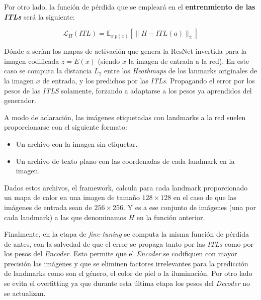             \medskip

            \noindent Por otro lado, la función de pérdida que se empleará en el \textbf{entrenmiento de las \textit{ITLs}} será la siguiente: 

            \begin{equation} \label{eq::L2}
                \mathcal{L}_H(ITL) = \mathbb{E}_{x ~ p(x)} \left[ \| H-ITL(a)\|_2 \right]
            \end{equation}

            \noindent Dónde $a$ serían los mapas de activación que genera la ResNet invertida para la imagen codificada $z=E(x)$ (siendo $x$ la imagen de entrada a la red). En este caso se computa la distancia \textbf{$L_2$} entre los \textit{Heathmaps} de los lanmarks originales de la imagen $x$ de entrada, y los predichos por las \textit{ITLs}. Propagando el error por los pesos de las \textit{ITLS} solamente, forzando a adaptarse a los pesos ya aprendidos del generador.

            \medskip

            \noindent A modo de aclaración, las imágenes etiquetadas con landmarks a la red suelen proporcionarse con el siguiente formato: 

            \begin{itemize}
                \item Un archivo con la imagen sin etiquetar. 
                \item Un archivo de texto plano con las coordenadas de cada landmark en la imagen.
            \end{itemize}

            \noindent Dados estos archivos, el framework, calcula para cada landmark proporcionado un mapa de calor en una imagen de tamaño $128 \times 128$ en el caso de que las imágenes de entrada sean de $256 \times 256$. Y es a ese conjunto de imágenes (una por cada landmark) a las que denominamos $H$ en la función anterior.

            \medskip

            \noindent Finalmente, en la etapa de \textit{fine-tuning} se computa la misma función de pérdida de antes, con la salvedad de que el error se propaga tanto por las \textit{ITLs} como por los pesos del \textit{Encoder}. Esto permite que el \textit{Encoder} se codifiquen con mayor precisión las imágenes y que se eliminen factores irrelevantes para la predicción de landmarks como son el género, el color de piel o la iluminación. Por otro lado se evita el overfitting ya que durante esta última etapa los pesos del \textit{Decoder} no se actualizan.

